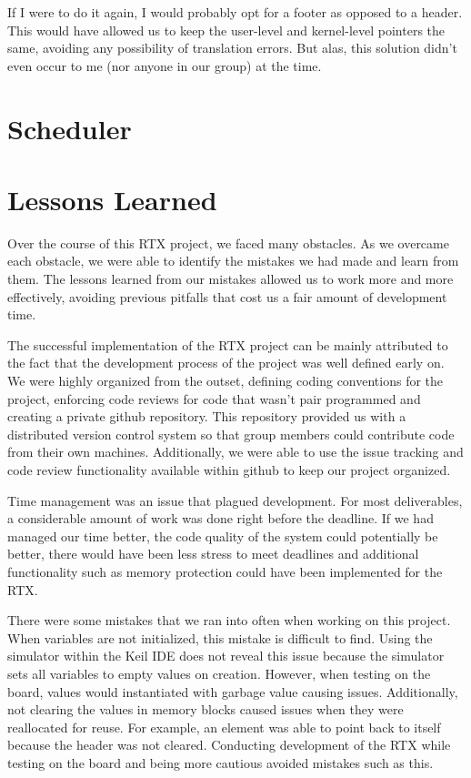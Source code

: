 \documentclass[12pt]{report}
\begin{document}
If I were to do it again, I would probably opt for a footer as opposed to a
header. This would have allowed us to keep the user-level and kernel-level
pointers the same, avoiding any possibility of translation errors. But alas,
this solution didn't even occur to me (nor anyone in our group) at the time.
\section{Scheduler}

\section{Lessons Learned}
  Over the course of this RTX project, we faced many obstacles. As we overcame each obstacle, we were able to identify the mistakes we had made and learn from them. The lessons learned from our mistakes allowed us to work more and more effectively, avoiding previous pitfalls that cost us a fair amount of development time.

The successful implementation of the RTX project can be mainly attributed to the fact that the development process of the project was well defined early on. We were highly organized from the outset, defining coding conventions for the project, enforcing code reviews for code that wasn’t pair programmed and creating a private github repository. This repository provided us with a distributed version control system so that group members could contribute code from their own machines. Additionally, we were able to use the issue tracking and code review functionality available within github to keep our project organized.

Time management was an issue that plagued development. For most deliverables, a considerable amount of work was done right before the deadline. If we had managed our time better, the code quality of the system could potentially be better, there would have been less stress to meet deadlines and additional functionality such as memory protection could have been implemented for the RTX.

There were some mistakes that we ran into often when working on this project. When variables are not initialized, this mistake is difficult to find. Using the simulator within the Keil IDE does not reveal this issue because the simulator sets all variables to empty values on creation. However, when testing on the board, values would instantiated with garbage value causing issues. Additionally, not clearing the values in memory blocks caused issues when they were reallocated for reuse. For example, an element was able to point back to itself because the header was not cleared. Conducting development of the RTX while testing on the board and being more cautious avoided mistakes such as this.
\end{document}
